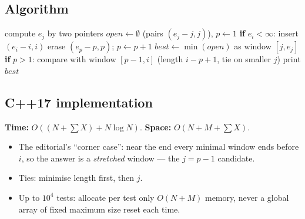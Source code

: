 \subsection*{Algorithm}
\begin{algorithmic}[1]
\State compute $e_j$ by two pointers
\State $open\gets\emptyset$ (pairs $(e_j-j,j)$), $p\gets1$
  \State \textbf{if} $e_i<\infty$: insert $(e_i-i,i)$
   erase $(e_p-p,p)$; $p\gets p+1$ \EndWhile
  \State $best\gets\min(open)$ as window $[j,e_j]$
  \State \textbf{if} $p>1$: compare with window $[p-1,i]$ (length $i-p+1$, tie on smaller $j$)
  \State print $best$
\EndFor
\end{algorithmic}


\subsection*{C++17 implementation}

\begin{complexitybox}
\textbf{Time:} $O((N+\sum X)+N\log N)$. \textbf{Space:} $O(N+M+\sum X)$.
\end{complexitybox}

\begin{pitfallbox}
\begin{itemize}
  \item The editorial's ``corner case'': near the end every minimal window
        ends before $i$, so the answer is a \emph{stretched} window --- the
        $j=p-1$ candidate.
  \item Ties: minimise length first, then $j$.
  \item Up to $10^4$ tests: allocate per test only $O(N+M)$ memory, never
        a global array of fixed maximum size reset each time.
\end{itemize}
\end{pitfallbox}

